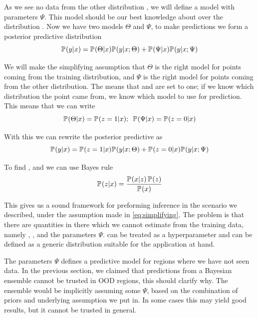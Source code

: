 \documentclass[../main.tex]{subfiles}
\begin{document}
As we see no data from the other distribution , we will define a model with parameters $\Psi$. This model should be our best knowledge about  over the distribution . 
Now we have two models $\Theta$ and $\Psi$, to make predictions we form a posterior predictive distribution
\begin{equation}{}
    \label{eq:full_formalizing_posterior}
    \mathbb{P}_{}(y|x) = \mathbb{P}_{}(\Theta|x) \mathbb{P}_{}(y| x; \Theta) + \mathbb{P}_{}(\Psi|x) \mathbb{P}_{}(y | x; \Psi)
\end{equation}

We will make the simplifying assumption that $\Theta$ is the right model for points coming from the training distribution, and $\Psi$ is the right model for points coming from the other distribution. The means that  and  are set to one; if we know which distribution the point came from, we know which model to use for prediction. This means that we can write
\begin{equation}
    \label{eq:simplifying}
    \mathbb{P}_{}(\Theta|x) = \mathbb{P}_{}(z=1|x) ;\,\,\, \mathbb{P}_{}(\Psi|x) = \mathbb{P}_{}(z=0|x)
\end{equation}{}

With this we can rewrite the posterior predictive as
\begin{equation}
    \label{eq:final_posterior}
    \mathbb{P}_{}(y|x) = \mathbb{P}_{}(z=1|x) \mathbb{P}_{}(y| x; \Theta) + \mathbb{P}_{}(z=0|x) \mathbb{P}_{}(y | x; \Psi)
\end{equation}{}

To find , and we can use Bayes rule
$$ 
    \mathbb{P}_{}(z|x) = \frac{\mathbb{P}_{}(x|z) \, \mathbb{P}_{}(z)}{\mathbb{P}_{}(x)}
$$

This gives us a sound framework for preforming inference in the scenario we described, under the assumption made in \cref{eq:simplifying}. The problem is that there are quantities in there which we cannot estimate from the training data, namely , , and the parameters $\Psi$.  can be treated as a hyperparameter and  can be defined as a generic distribution suitable for the application at hand.

The parameters $\Psi$ defines a predictive model for regions where we have not seen data. In the previous section, we claimed that predictions from a Bayesian ensemble cannot be trusted in OOD regions, this should clarify why. The ensemble would be implicitly assuming some $\Psi$, based on the combination of priors and underlying assumption we put in. In some cases this may yield good results, but it cannot be trusted in general. 
\end{document}
